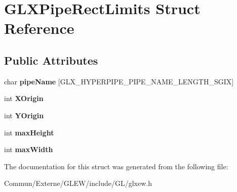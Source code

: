 \hypertarget{struct_g_l_x_pipe_rect_limits}{}\section{G\+L\+X\+Pipe\+Rect\+Limits Struct Reference}
\label{struct_g_l_x_pipe_rect_limits}
\subsection*{Public Attributes}
\begin{DoxyCompactItemize}
\item 
char {\bfseries pipe\+Name} \mbox{[}G\+L\+X\+\_\+\+H\+Y\+P\+E\+R\+P\+I\+P\+E\+\_\+\+P\+I\+P\+E\+\_\+\+N\+A\+M\+E\+\_\+\+L\+E\+N\+G\+T\+H\+\_\+\+S\+G\+IX\mbox{]}\hypertarget{struct_g_l_x_pipe_rect_limits_ae78b4b6656101bc841946733a5b6e5ce}{}\label{struct_g_l_x_pipe_rect_limits_ae78b4b6656101bc841946733a5b6e5ce}

\item 
int {\bfseries X\+Origin}\hypertarget{struct_g_l_x_pipe_rect_limits_a3e5a965059d9f5d2ca42acd35af5bb9b}{}\label{struct_g_l_x_pipe_rect_limits_a3e5a965059d9f5d2ca42acd35af5bb9b}

\item 
int {\bfseries Y\+Origin}\hypertarget{struct_g_l_x_pipe_rect_limits_a50e06bcf0dae95854be7d93a515199e9}{}\label{struct_g_l_x_pipe_rect_limits_a50e06bcf0dae95854be7d93a515199e9}

\item 
int {\bfseries max\+Height}\hypertarget{struct_g_l_x_pipe_rect_limits_a27572e499c0d3280031c2ad8e387c0c1}{}\label{struct_g_l_x_pipe_rect_limits_a27572e499c0d3280031c2ad8e387c0c1}

\item 
int {\bfseries max\+Width}\hypertarget{struct_g_l_x_pipe_rect_limits_a8662c7a712b30620e25fc994adf337a1}{}\label{struct_g_l_x_pipe_rect_limits_a8662c7a712b30620e25fc994adf337a1}

\end{DoxyCompactItemize}


The documentation for this struct was generated from the following file\+:\begin{DoxyCompactItemize}
\item 
Commun/\+Externe/\+G\+L\+E\+W/include/\+G\+L/glxew.\+h\end{DoxyCompactItemize}
